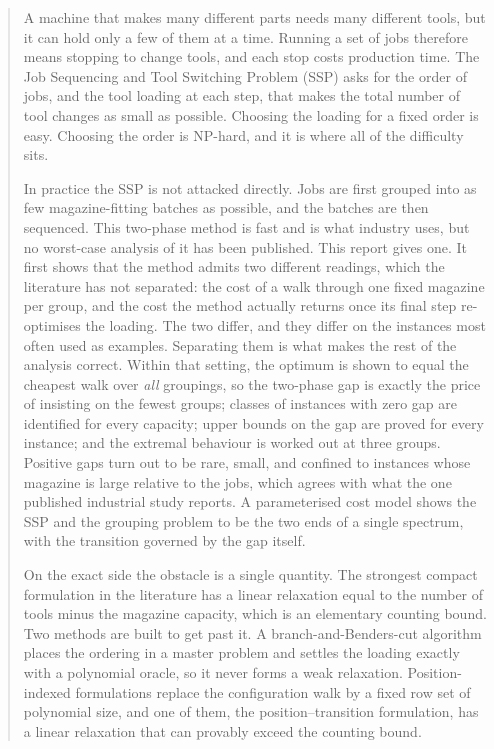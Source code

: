 \begin{abstract}
\noindent
A machine that makes many different parts needs many different tools, but it can
hold only a few of them at a time. Running a set of jobs therefore means stopping
to change tools, and each stop costs production time. The Job Sequencing and Tool
Switching Problem (SSP) asks for the order of jobs, and the tool loading at each
step, that makes the total number of tool changes as small as possible. Choosing
the loading for a fixed order is easy. Choosing the order is NP-hard, and it is
where all of the difficulty sits.

In practice the SSP is not attacked directly. Jobs are first grouped into as few
magazine-fitting batches as possible, and the batches are then sequenced. This
two-phase method is fast and is what industry uses, but no worst-case analysis of
it has been published. This report gives one. It first shows that the method
admits two different readings, which the literature has not separated: the cost of
a walk through one fixed magazine per group, and the cost the method actually
returns once its final step re-optimises the loading. The two differ, and they
differ on the instances most often used as examples. Separating them is what makes
the rest of the analysis correct. Within that setting, the optimum is shown to
equal the cheapest walk over \emph{all} groupings, so the two-phase gap is exactly
the price of insisting on the fewest groups; classes of instances with zero gap are
identified for every capacity; upper bounds on the gap are proved for every
instance; and the extremal behaviour is worked out at three groups. Positive gaps
turn out to be rare, small, and confined to instances whose magazine is large
relative to the jobs, which agrees with what the one published industrial study
reports. A parameterised cost model shows the SSP and the grouping problem to be
the two ends of a single spectrum, with the transition governed by the gap itself.

On the exact side the obstacle is a single quantity. The strongest compact
formulation in the literature has a linear relaxation equal to the number of tools
minus the magazine capacity, which is an elementary counting bound. Two methods are
built to get past it. A branch-and-Benders-cut algorithm places the ordering in a
master problem and settles the loading exactly with a polynomial oracle, so it never
forms a weak relaxation. Position-indexed formulations replace the configuration
walk by a fixed row set of polynomial size, and one of them, the
position--transition formulation, has a linear relaxation that can provably exceed the
counting bound.


\end{abstract}
